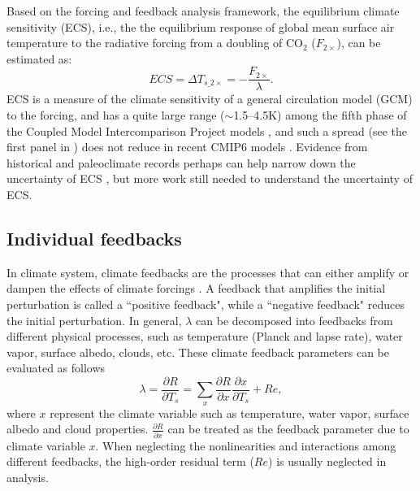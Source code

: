 Based on the forcing and feedback analysis framework, the equilibrium climate sensitivity (ECS), i.e., the the equilibrium response of global mean surface air temperature to the radiative forcing from a doubling of CO$_2$ ($F_{2\times}$), can be estimated as:
\begin{equation}
    ECS = \Delta T_{s\_2\times}=-\frac{F_{2\times}}{\lambda}.
    \label{eq:ecs}
\end{equation}
ECS is a measure of the climate sensitivity of a general circulation model (GCM) to the forcing, and has a quite large range ($\sim$1.5--4.5K) among the fifth phase of the Coupled Model Intercomparison Project \citep[CMIP5;][]{Taylor2012overview} models \citep[e.g.,][]{Andrews2012forcing,Ceppi2017}, and such a spread (see the first panel in ) does not reduce in recent CMIP6 \citep{Eyring2016overview} models  \citep{Zelinka2020causes}. Evidence from historical and paleoclimate records perhaps can help narrow down the uncertainty of ECS \citep{Sherwood2020}, but more work still needed to understand the uncertainty of ECS.

\subsection{Individual feedbacks}
\label{sec:individual_fbks}

In climate system, climate feedbacks are the processes that can either amplify or dampen the effects of climate forcings \citep{Hansen1984}. A feedback that amplifies the initial perturbation is called a ``positive feedback", while a ``negative feedback" reduces the initial perturbation. In general, $\lambda$ can be decomposed into feedbacks from different physical processes, such as temperature (Planck and lapse rate), water vapor, surface albedo, clouds, etc. These climate feedback parameters can be evaluated as follows
\begin{equation}
    \lambda = \frac{\partial R}{\partial T_s} = \sum_x \frac{\partial R}{\partial x}\frac{\partial x}{\partial T_s} + Re, %
    \label{eq:lambda}
\end{equation}
where $x$ represent the climate variable such as temperature, water vapor, surface albedo and cloud properties. $\frac{\partial R}{\partial x}$ can be treated as the feedback parameter due to climate variable $x$. When neglecting the nonlinearities and interactions among different feedbacks, the high-order residual term ($Re$) is usually neglected in analysis. 

